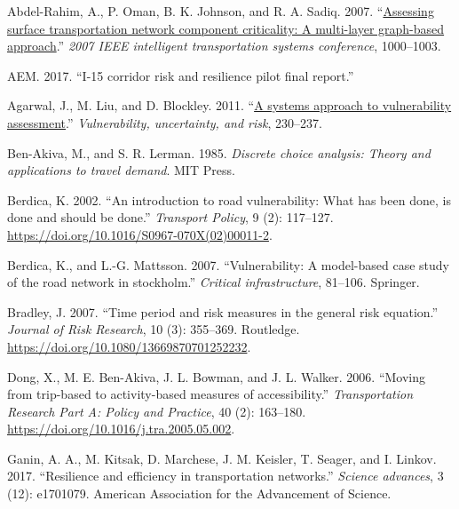 \documentclass[]{ascelike-new}
\newlength{\cslhangindent}
\newlength{\cslentryspacingunit} %
\newenvironment{CSLReferences}[2] %
 {%
  \setlength{\parindent}{0pt}
  \ifodd #1
  \let\oldpar\par
  \def\par{\hangindent=\cslhangindent\oldpar}
  \fi
  \setlength{\parskip}{#2\cslentryspacingunit}
 }%
 {}
\begin{document}
\hypertarget{refs}{}
\begin{CSLReferences}{1}{0}
\leavevmode{}%
Abdel-Rahim, A., P. Oman, B. K. Johnson, and R. A. Sadiq. 2007.
{``\href{https://doi.org/10.1109/ITSC.2007.4357801}{Assessing surface
transportation network component criticality: A multi-layer graph-based
approach}.''} \emph{2007 IEEE intelligent transportation systems
conference}, 1000--1003.

\leavevmode{}%
AEM. 2017. {``I-15 corridor risk and resilience pilot final report.''}

\leavevmode{}%
Agarwal, J., M. Liu, and D. Blockley. 2011.
{``\href{https://doi.org/10.1061/41170(400)28}{A systems approach to
vulnerability assessment}.''} \emph{Vulnerability, uncertainty, and
risk}, 230--237.

\leavevmode{}%
Ben-Akiva, M., and S. R. Lerman. 1985. \emph{Discrete choice analysis:
Theory and applications to travel demand}. MIT Press.

\leavevmode{}%
Berdica, K. 2002. {``An introduction to road vulnerability: What has
been done, is done and should be done.''} \emph{Transport Policy}, 9
(2): 117--127. \url{https://doi.org/10.1016/S0967-070X(02)00011-2}.

\leavevmode{}%
Berdica, K., and L.-G. Mattsson. 2007. {``Vulnerability: A model-based
case study of the road network in stockholm.''} \emph{Critical
infrastructure}, 81--106. Springer.

\leavevmode{}%
Bradley, J. 2007. {``Time period and risk measures in the general risk
equation.''} \emph{Journal of Risk Research}, 10 (3): 355--369.
Routledge. \url{https://doi.org/10.1080/13669870701252232}.

\leavevmode{}%
Dong, X., M. E. Ben-Akiva, J. L. Bowman, and J. L. Walker. 2006.
{``Moving from trip-based to activity-based measures of
accessibility.''} \emph{Transportation Research Part A: Policy and
Practice}, 40 (2): 163--180.
\url{https://doi.org/10.1016/j.tra.2005.05.002}.

\leavevmode{}%
Ganin, A. A., M. Kitsak, D. Marchese, J. M. Keisler, T. Seager, and I.
Linkov. 2017. {``Resilience and efficiency in transportation
networks.''} \emph{Science advances}, 3 (12): e1701079. American
Association for the Advancement of Science.


\end{CSLReferences}
\end{document}
